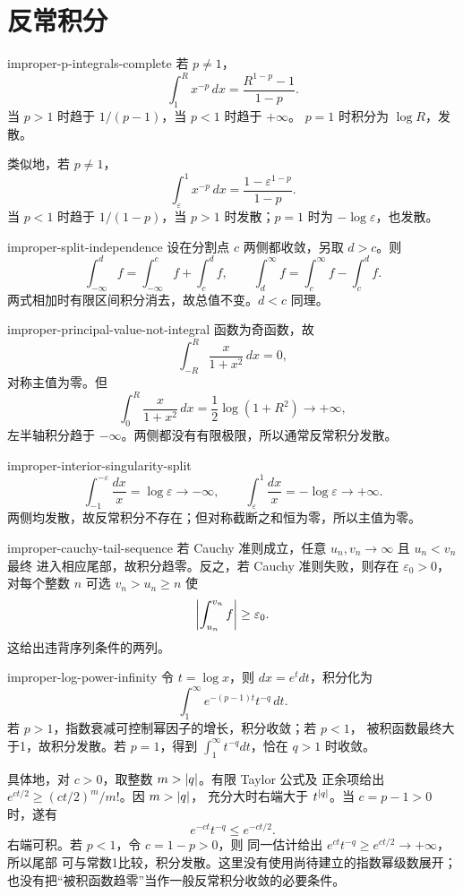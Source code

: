 \chapter{反常积分}
\label{chap:improper-integrals-solutions}

\begin{solution}{improper-p-integrals-complete}
若 \(p\ne1\)，
\[
 \int_1^R x^{-p}\,dx=\frac{R^{1-p}-1}{1-p}.
\]
当 \(p>1\) 时趋于 \(1/(p-1)\)，当 \(p<1\) 时趋于 \(+\infty\)。
\(p=1\) 时积分为 \(\log R\)，发散。

类似地，若 \(p\ne1\)，
\[
 \int_\varepsilon^1x^{-p}\,dx
 =\frac{1-\varepsilon^{1-p}}{1-p}.
\]
当 \(p<1\) 时趋于 \(1/(1-p)\)，当 \(p>1\) 时发散；\(p=1\) 时为
\(-\log\varepsilon\)，也发散。
\end{solution}

\begin{solution}{improper-split-independence}
设在分割点 \(c\) 两侧都收敛，另取 \(d>c\)。则
\[
 \int_{-\infty}^{d}f
 =\int_{-\infty}^{c}f+\int_c^d f,
\qquad
 \int_d^\infty f
 =\int_c^\infty f-\int_c^d f.
\]
两式相加时有限区间积分消去，故总值不变。\(d<c\) 同理。
\end{solution}

\begin{solution}{improper-principal-value-not-integral}
函数为奇函数，故
\[
 \int_{-R}^{R}\frac{x}{1+x^2}\,dx=0,
\]
对称主值为零。但
\[
 \int_0^R\frac{x}{1+x^2}\,dx
 =\frac12\log(1+R^2)\to+\infty,
\]
左半轴积分趋于 \(-\infty\)。两侧都没有有限极限，所以通常反常积分发散。
\end{solution}

\begin{solution}{improper-interior-singularity-split}
\[
 \int_{-1}^{-\varepsilon}\frac{dx}{x}=\log\varepsilon\to-\infty,
\qquad
 \int_{\varepsilon}^{1}\frac{dx}{x}=-\log\varepsilon\to+\infty.
\]
两侧均发散，故反常积分不存在；但对称截断之和恒为零，所以主值为零。
\end{solution}

\begin{solution}{improper-cauchy-tail-sequence}
若 Cauchy 准则成立，任意 \(u_n,v_n\to\infty\) 且 \(u_n<v_n\) 最终
进入相应尾部，故积分趋零。反之，若 Cauchy 准则失败，则存在
\(\varepsilon_0>0\)，对每个整数 \(n\) 可选
\(v_n>u_n\ge n\) 使
\[
 \left|\int_{u_n}^{v_n}f\right|\ge\varepsilon_0.
\]
这给出违背序列条件的两列。
\end{solution}

\begin{solution}{improper-log-power-infinity}
令 \(t=\log x\)，则 \(dx=e^t dt\)，积分化为
\[
 \int_1^\infty e^{-(p-1)t}t^{-q}\,dt.
\]
若 \(p>1\)，指数衰减可控制幂因子的增长，积分收敛；若 \(p<1\)，
被积函数最终大于1，故积分发散。若 \(p=1\)，得到
\(\int_1^\infty t^{-q}dt\)，恰在 \(q>1\) 时收敛。

具体地，对 \(c>0\)，取整数 \(m>\left|q\right|\)。有限 Taylor 公式及
正余项给出 \(e^{ct/2}\ge(ct/2)^m/m!\)。因 \(m>\left|q\right|\)，
充分大时右端大于 \(t^{\left|q\right|}\)。当 \(c=p-1>0\) 时，遂有
\[
 e^{-ct}t^{-q}\le e^{-ct/2}.
\]
右端可积。若 \(p<1\)，令 \(c=1-p>0\)，则
同一估计给出 \(e^{ct}t^{-q}\ge e^{ct/2}\to+\infty\)，所以尾部
可与常数1比较，积分发散。这里没有使用尚待建立的指数幂级数展开；
也没有把“被积函数趋零”当作一般反常积分收敛的必要条件。
\end{solution}

